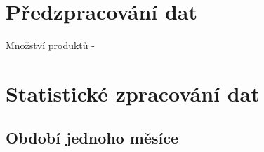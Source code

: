 

\section{Předzpracování dat}

Množství produktů - 


\section{Statistické zpracování dat}




% 



\subsection{Období jednoho měsíce}




